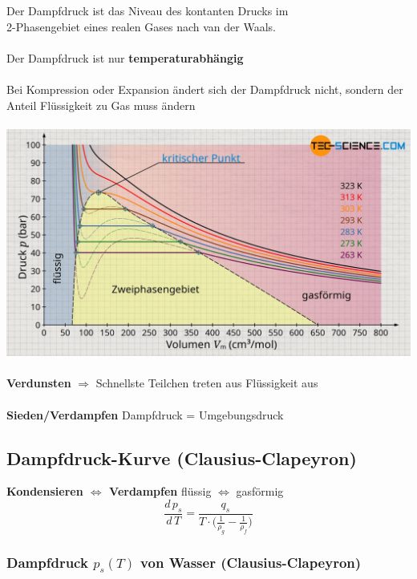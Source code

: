 Der Dampfdruck ist das Niveau des kontanten Drucks im\\
2-Phasengebiet eines realen Gases nach van der Waals. \\
\\
Der Dampfdruck ist nur \textbf{temperaturabhängig} \\
\\
Bei Kompression oder Expansion ändert sich der Dampfdruck nicht, sondern der Anteil Flüssigkeit zu Gas muss ändern \\
\\

\includegraphics[width=0.9\linewidth]{Bilder/dampfdruck} \\
\\
\textbf{Verdunsten} $\Rightarrow$ Schnellste Teilchen treten aus Flüssigkeit aus \\
\\
\textbf{Sieden/Verdampfen} Dampfdruck = Umgebungsdruck






\subsection{Dampfdruck-Kurve (Clausius-Clapeyron)}

\textbf{Kondensieren $\Leftrightarrow$ Verdampfen}  \qquad flüssig $\Leftrightarrow$ gasförmig  \\

$$ \boxed{ \frac{d \, p_s}{d\, T} = \frac{q_s}{T \cdot  \Big( \frac{1}{\rho_g} - \frac{1}{\rho_f} \Big)  }     } $$



\subsubsection{Dampfdruck $p_s(T)$ von Wasser (Clausius-Clapeyron)}

